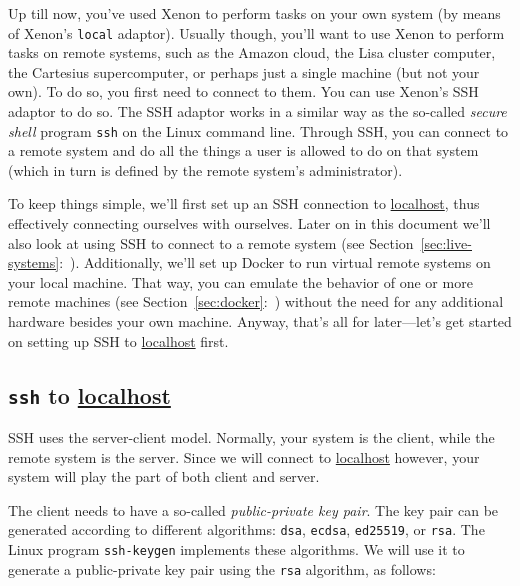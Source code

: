 \documentclass[12pt, a4paper, twoside, openany, titlepage]{book}
\begin{document}
Up till now, you've used Xenon to perform tasks on your own system (by means of Xenon's \texttt{local} adaptor). Usually though, you'll want to use Xenon to perform tasks on remote systems, such as the Amazon cloud, the Lisa cluster computer, the Cartesius supercomputer, or perhaps just a single machine (but not your own). To do so, you first need to connect to them. You can use Xenon's SSH adaptor to do so. The SSH adaptor works in a similar way as the so-called \textit{secure shell} program \texttt{ssh} on the Linux command line. Through SSH, you can connect to a remote system and do all the things a user is allowed to do on that system (which in turn is defined by the remote system's administrator).

To keep things simple, we'll first set up an SSH connection to \url{localhost}, thus effectively connecting ourselves with ourselves. Later on in this document we'll also look at using SSH to connect to a remote system (see Section~\ref{sec:live-systems}:~\textit{}). Additionally, we'll set up Docker to run virtual remote systems on your local machine. That way, you can emulate the behavior of one or more remote machines (see Section~\ref{sec:docker}:~\textit{}) without the need for any additional hardware besides your own machine. Anyway, that's all for later---let's get started on setting up SSH to \url{localhost} first.

\subsection{\texttt{ssh} to \url{localhost}}

SSH uses the server-client model. Normally, your system is the client, while the remote system is the server. Since we will connect to \url{localhost} however, your system will play the part of both client and server.

The client needs to have a so-called \textit{public-private key pair}. The key pair can be generated according to different algorithms:
\texttt{dsa},
\texttt{ecdsa},
\texttt{ed25519}, or
\texttt{rsa}.
The Linux program \texttt{ssh-keygen} implements these algorithms. We will use it to generate a public-private key pair using the \texttt{rsa} algorithm, as follows:
\end{document}
